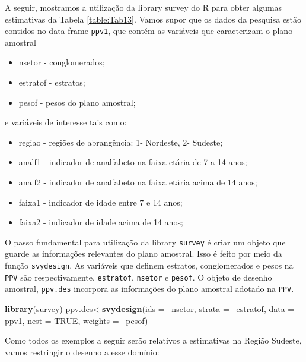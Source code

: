 \documentclass[]{book}
\newenvironment{Shaded}{\begin{snugshade}}{\end{snugshade}}
\newcommand{\KeywordTok}[1]{\textcolor[rgb]{0.13,0.29,0.53}{\textbf{{#1}}}}
\newcommand{\DataTypeTok}[1]{\textcolor[rgb]{0.13,0.29,0.53}{{#1}}}
\newcommand{\OtherTok}[1]{\textcolor[rgb]{0.56,0.35,0.01}{{#1}}}
\newcommand{\NormalTok}[1]{{#1}}
\providecommand{\tightlist}{%
  \setlength{\itemsep}{0pt}\setlength{\parskip}{0pt}}
\numberwithin{example}{chapter}
\numberwithin{remark}{chapter}
\numberwithin{definition}{chapter}
\begin{document}
A seguir, mostramos a utilização da library survey do R para obter
algumas estimativas da Tabela \ref{table:Tab13}. Vamos supor que os
dados da pesquisa estão contidos no data frame \texttt{ppv1}, que contém
as variáveis que caracterizam o plano amostral

\begin{itemize}
\tightlist
\item
  nsetor - conglomerados;
\item
  estratof - estratos;
\item
  pesof - pesos do plano amostral;
\end{itemize}

e variáveis de interesse tais como:

\begin{itemize}
\tightlist
\item
  regiao - regiões de abrangência: 1- Nordeste, 2- Sudeste;
\item
  analf1 - indicador de analfabeto na faixa etária de 7 a 14 anos;
\item
  analf2 - indicador de analfabeto na faixa etária acima de 14 anos;
\item
  faixa1 - indicador de idade entre 7 e 14 anos;
\item
  faixa2 - indicador de idade acima de 14 anos;
\end{itemize}

O passo fundamental para utilização da library \texttt{survey} é criar
um objeto que guarde as informações relevantes do plano amostral. Isso é
feito por meio da função \texttt{svydesign}. As variáveis que definem
estratos, conglomerados e pesos na \texttt{PPV} são respectivamente,
\texttt{estratof}, \texttt{nsetor} e \texttt{pesof}. O objeto de desenho
amostral, \texttt{ppv.des} incorpora as informações do plano amostral
adotado na \texttt{PPV}.

\begin{Shaded}
\begin{Highlighting}[]
\KeywordTok{library}\NormalTok{(survey)}
\NormalTok{ppv.des<-}\KeywordTok{svydesign}\NormalTok{(}\DataTypeTok{ids =} \NormalTok{~nsetor, }\DataTypeTok{strata =} \NormalTok{~estratof,}
\DataTypeTok{data =} \NormalTok{ppv1, }\DataTypeTok{nest =} \OtherTok{TRUE}\NormalTok{, }\DataTypeTok{weights =} \NormalTok{~pesof)}
\end{Highlighting}
\end{Shaded}

Como todos os exemplos a seguir serão relativos a estimativas na Região
Sudeste, vamos restringir o desenho a esse domínio:
\end{document}
